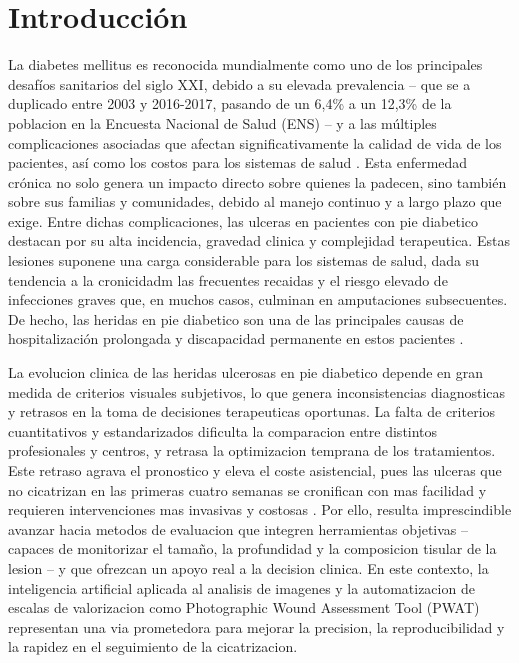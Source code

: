 
\section{Introducción}
\label{sec:Intr}

La diabetes mellitus es reconocida mundialmente como uno de los principales desafíos sanitarios del siglo XXI, debido a su elevada prevalencia -- que se a duplicado entre 2003 y 2016-2017, pasando de un 6,4\% a un 12,3\%  de la poblacion en la Encuesta Nacional de Salud (ENS) \cite{troncoso2020estilos} -- y a las múltiples complicaciones asociadas que afectan significativamente la calidad de vida de los pacientes, así como los costos para los sistemas de salud \cite{ministerio2022estrategia}. Esta enfermedad crónica no solo genera un impacto directo sobre quienes la padecen, sino también sobre sus familias y comunidades, debido al manejo continuo y a largo plazo que exige. Entre dichas complicaciones, las ulceras en pacientes con pie diabetico destacan por su alta incidencia, gravedad clinica y complejidad terapeutica. Estas lesiones suponene una carga considerable para los sistemas de salud, dada su tendencia a la cronicidadm las frecuentes recaidas y el riesgo elevado de infecciones graves que, en muchos casos, culminan en amputaciones subsecuentes. De hecho, las heridas en pie diabetico son una de las principales causas de hospitalización prolongada y discapacidad permanente en estos pacientes \cite{mishra2017diabetic,bandyk2018diabetic}.

La evolucion clinica de las heridas ulcerosas en pie diabetico depende en gran medida de criterios visuales subjetivos, lo que genera inconsistencias diagnosticas y retrasos en  la toma de decisiones terapeuticas oportunas. La falta de criterios cuantitativos y estandarizados dificulta la comparacion entre distintos profesionales y centros, y retrasa la optimizacion temprana de los tratamientos. Este retraso agrava el pronostico y eleva el coste asistencial, pues las ulceras que no cicatrizan en las primeras cuatro semanas se cronifican con mas facilidad y requieren intervenciones mas invasivas y costosas \cite{mishra2017diabetic,bandyk2018diabetic}. Por ello, resulta imprescindible avanzar hacia metodos de evaluacion que integren herramientas objetivas -- capaces de monitorizar el tamaño, la profundidad y la composicion tisular de la lesion -- y que ofrezcan un apoyo real a la decision clinica. En este contexto, la inteligencia artificial aplicada al analisis de imagenes y la automatizacion de escalas de valorizacion como Photographic Wound Assessment Tool (PWAT) \cite{thompson2013reliability} representan una via prometedora para mejorar la precision, la reproducibilidad y la rapidez en el seguimiento de la cicatrizacion.

